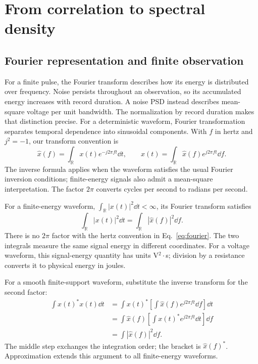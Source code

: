 
\section{From correlation to spectral density}
\subsection{Fourier representation and finite observation}
For a finite pulse, the Fourier transform describes how its energy is distributed over frequency. Noise persists throughout an observation, so its accumulated energy increases with record duration. A noise PSD instead describes mean-square voltage per unit bandwidth. The normalization by record duration makes that distinction precise.
For a deterministic waveform, Fourier transformation separates temporal dependence into sinusoidal components. With $f$ in hertz and $j^2=-1$, our transform convention is
\begin{equation}
\widehat x(f)=\int_{\mathbb R}x(t)e^{-j2\pi ft}\dd t,\qquad
x(t)=\int_{\mathbb R}\widehat x(f)e^{j2\pi ft}\dd f.
\label{eq:fourier}
\end{equation}
The inverse formula applies when the waveform satisfies the usual Fourier inversion conditions; finite-energy signals also admit a mean-square interpretation. The factor $2\pi$ converts cycles per second to radians per second.

\begin{concept}[title={Parseval--Plancherel theorem}]
For a finite-energy waveform, $\int_{\mathbb R}|x(t)|^2\dd t<\infty$, its Fourier transform satisfies
\begin{equation}
\boxed{\int_{\mathbb R}|x(t)|^2\dd t
=\int_{\mathbb R}|\widehat x(f)|^2\dd f.}
\label{eq:parseval}
\end{equation}
There is no $2\pi$ factor with the hertz convention in Eq.~\eqref{eq:fourier}. The two integrals measure the same signal energy in different coordinates. For a voltage waveform, this signal-energy quantity has units V$^2\cdot$s; division by a resistance converts it to physical energy in joules.
\end{concept}
For a smooth finite-support waveform, substitute the inverse transform for the second factor:
\begin{align*}
\int x(t)^*x(t)\dd t
&=\int x(t)^*\left[\int\widehat x(f)e^{j2\pi ft}\dd f\right]\dd t\\
&=\int\widehat x(f)\left[\int x(t)^*e^{j2\pi ft}\dd t\right]\dd f\\
&=\int|\widehat x(f)|^2\dd f.
\end{align*}
The middle step exchanges the integration order; the bracket is $\widehat x(f)^*$. Approximation extends this argument to all finite-energy waveforms.


